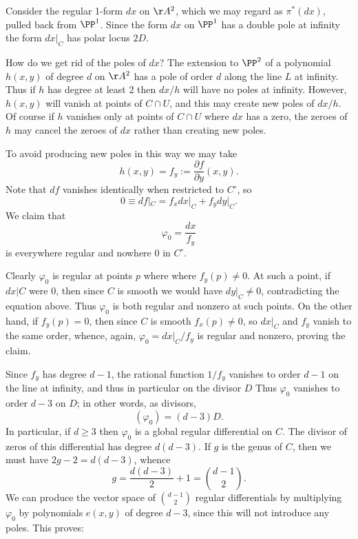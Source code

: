 Consider the
regular 1-form $dx$ on $\AA^2$, which we may regard as $\pi^{*}(dx)$, pulled back from $\PP^{1}$.
Since the form $dx$ on $\PP^{1}$ has a double pole at infinity the form $dx|_{C}$ has polar
locus $2D$.
 
How do we get rid of the poles of $dx$? The extension to $\PP^2$ of a polynomial $h(x,y)$ of degree $d$ on
$\AA^2$ has a pole of order $d$ along the line $L$ at infinity. Thus if $h$ has degree at least 2 then $dx/h$ will have no poles at infinity. However, $h(x,y)$ will vanish at points of $C \cap U$, and this may create new poles of $dx/h$. Of course if $h$ vanishes only at  points of $C \cap U$ where $dx$ has a zero, the zeroes of $h$ may cancel the zeroes of $dx$ rather than creating new poles.
 
 To avoid producing new poles in this way we may take
 $$
 h(x,y) = f_{y} := \frac{\partial f}{\partial y}(x,y).
 $$
Note that $df$ vanishes identically when restricted to $C^\circ$, so
 $$
 0 \equiv df|_{C} = f_{x}dx|_{C} + f_{y}dy|_{C} .
 $$
 We claim that 
 $$
\varphi_0 = \frac{dx}{f_{y}}
$$
is everywhere regular and nowhere 0 in $C^\circ$. 

Clearly $\varphi_0$ is regular at points $p$ where
where $f_{y}(p) \neq 0$. At such a point, if $dx|C$ were 0, then since $C$ is smooth we would have $dy|_{C} \neq 0$, contradicting the equation above. Thus $\varphi_{0}$ is both regular and nonzero at such points. On the other hand, if $f_{y}(p) = 0$, then since $C$ is smooth $f_{x}(p) \neq 0$, so $dx|_{C}$ and $f_{y}$ vanish to the same
order, whence, again, $\varphi_0 = dx|_{C}/f_{y}$ is regular and nonzero, proving the claim.

Since $f_{y}$ has degree $d-1$, the rational function $1/f_{y}$ vanishes to order $d-1$ on the line
at infinity, and thus in particular on the divisor $D$ Thus $\varphi_0$ vanishes to order $d-3$ on $D$; in other words, as divisors,
$$
(\varphi_0) = (d-3)D.
$$
In particular, if $d \geq 3$ then $\varphi_0$ is a global regular differential on $C$. The divisor of
zeros of this differential has degree $d(d-3)$. If $g$ is the genus of $C$, then we must
have $2g-2 = d(d-3)$, whence 
$$
g = \frac{d(d-3)}{2} + 1 = \binom{d-1}{2}.
$$
We can produce the vector space of $\binom{d-1}{2}$ regular differentials by multiplying $\varphi_0$ by 
polynomials $e(x,y)$ 
  of degree $d-3$, since this will not introduce any poles. This proves:

